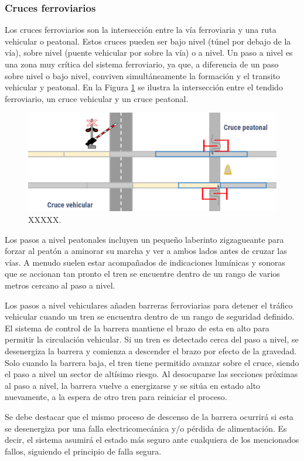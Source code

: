 \subsubsection{Cruces ferroviarios}

Los cruces ferroviarios son la intersección entre la vía ferroviaria y una ruta vehicular o peatonal. Estos cruces pueden ser bajo nivel (túnel por debajo de la vía), sobre nivel (puente vehicular por sobre la vía) o a nivel. Un paso a nivel es una zona muy crítica del sistema ferroviario, ya que, a diferencia de un paso sobre nivel o bajo nivel, conviven simultáneamente la formación y el transito vehicular y peatonal. En la Figura \ref{fig:cruce_1} se ilustra la intersección entre el tendido ferroviario, un cruce vehicular y un cruce peatonal.

    \begin{figure}[!h]
        \centering
        \includegraphics[width=1\textwidth]{Figuras/cruce}
        \centering\caption{XXXXX.}
        \label{fig:cruce_1}
    \end{figure}
    
Los pasos a nivel peatonales incluyen un pequeño laberinto zigzagueante para forzar al peatón a aminorar su marcha y ver a ambos lados antes de cruzar las vías. A menudo suelen estar acompañados de indicaciones lumínicas y sonoras que se accionan tan pronto el tren se encuentre dentro de un rango de varios metros cercano al paso a nivel.

Los pasos a nivel vehiculares añaden barreras ferroviarias para detener el tráfico vehicular cuando un tren se encuentra dentro de un rango de seguridad definido.  El sistema de control de la barrera mantiene el brazo de esta en alto para permitir la circulación vehicular. Si un tren es detectado cerca del paso a nivel, se desenergiza la barrera y comienza a descender el brazo por efecto de la gravedad. Solo cuando la barrera baja, el tren tiene permitido avanzar sobre el cruce, siendo el paso a nivel un sector de altísimo riesgo. Al desocuparse las secciones próximas al paso a nivel, la barrera vuelve a energizarse y se sitúa en estado alto nuevamente, a la espera de otro tren para reiniciar el proceso. 

Se debe destacar que el mismo proceso de descenso de la barrera ocurrirá si esta se desenergiza por una falla electricomecánica y/o pérdida de alimentación. Es decir, el sistema asumirá el estado más seguro ante cualquiera de los mencionados fallos, siguiendo el principio de falla segura.